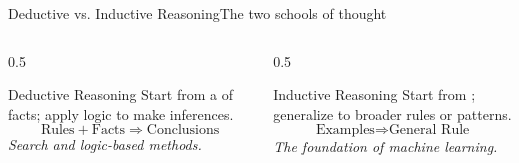 \documentclass[aspectratio=169,11pt]{beamer}
\begin{document}
\begin{frame}{Deductive vs. Inductive Reasoning}{The two schools of thought}
  \begin{columns}[T]
    \begin{column}{0.5\textwidth}
      \begin{block}{Deductive Reasoning}
        \small Start from a  of facts; apply logic to make
        inferences.
        \[ \text{Rules} + \text{Facts} \Rightarrow \text{Conclusions} \]
        \textit{Search and logic-based methods.}
      \end{block}
    \end{column}
    \begin{column}{0.5\textwidth}
      \begin{exampleblock}{Inductive Reasoning}
        \small Start from ; generalize to broader rules or
        patterns.
        \[ \text{Examples} \Rightarrow \text{General Rule} \]
        \textit{The foundation of machine learning.}
      \end{exampleblock}
    \end{column}
  \end{columns}
  \vspace{0.6em}
  \begin{center}\small
  \end{center}
\end{frame}
\end{document}
